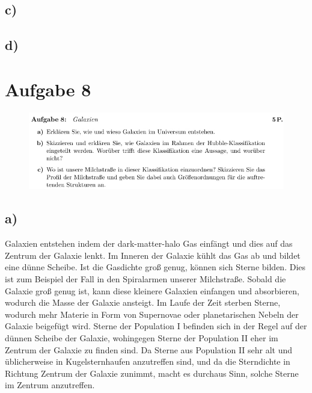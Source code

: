 \subsection{c)}



\subsection{d)}



\section{Aufgabe 8}

\begin{figure}[H]
    \centering
    \includegraphics[width=\textwidth]{images/Aufgabe8.jpg}
    \label{fig:3}
\end{figure}

\newpage
\subsection{a)}

    \justifying Galaxien entstehen indem der dark-matter-halo Gas einfängt und dies auf das Zentrum der Galaxie lenkt. Im
    Inneren der Galaxie kühlt das Gas ab und bildet eine dünne Scheibe. Ist die Gasdichte groß genug, können sich Sterne bilden. Dies ist zum 
    Beispiel der Fall in den Spiralarmen unserer Milchstraße. Sobald die Galaxie groß genug ist, kann diese kleinere Galaxien einfangen und
    absorbieren, wodurch die Masse der Galaxie ansteigt. Im Laufe der Zeit sterben Sterne, wodurch mehr Materie in Form von Supernovae oder 
    planetarischen Nebeln der Galaxie beigefügt wird. Sterne der Population I befinden sich in der Regel auf der dünnen Scheibe der Galaxie, 
    wohingegen Sterne der Population II eher im Zentrum der Galaxie zu finden sind. Da Sterne aus Population II sehr alt und üblicherweise 
    in Kugelsternhaufen anzutreffen sind, und da die Sterndichte in Richtung Zentrum der Galaxie zunimmt, macht es durchaus Sinn, solche Sterne
    im Zentrum anzutreffen. 

